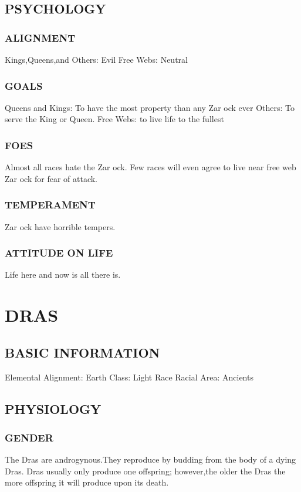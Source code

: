 \subsection{PSYCHOLOGY}
\subsubsection{ALIGNMENT}
Kings,Queens,and Others: Evil
Free Webs: Neutral
\subsubsection{GOALS}
Queens and Kings: To have the most property than any Zar ock ever
Others: To serve the King or Queen.
Free Webs: to live life to the fullest
\subsubsection{FOES}
Almost all races hate the Zar ock.  Few races will even agree to live near free
web Zar ock for fear of attack.
\subsubsection{TEMPERAMENT}
Zar ock have horrible tempers.
\subsubsection{ATTITUDE ON LIFE}
Life here and now is all there is.
\section{DRAS}
\subsection{BASIC INFORMATION}
Elemental Alignment: Earth
Class: Light Race
Racial Area: Ancients
\subsection{PHYSIOLOGY}
\subsubsection{GENDER }
The Dras are androgynous.They reproduce by budding from the body of a dying
Dras.  Dras usually only produce one offspring; however,the older the Dras the
more offspring it will produce upon its death.
